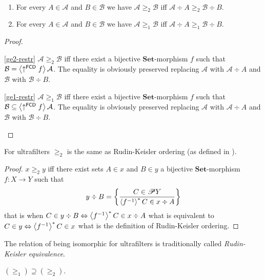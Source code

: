 \begin{prop}
~
\begin{enumerate}
\item \label{ge2-restr}For every $A\in\mathcal{A}$ and $B\in\mathcal{B}$
we have $\mathcal{A}\ge_{2}\mathcal{B}$ iff $\mathcal{A}\div A\ge_{2}\mathcal{B}\div B$.
\item \label{ge1-restr}For every $A\in\mathcal{A}$ and $B\in\mathcal{B}$
we have $\mathcal{A}\ge_{1}\mathcal{B}$ iff $\mathcal{A}\div A\ge_{1}\mathcal{B}\div B$.
\end{enumerate}
\end{prop}
\begin{proof}
~
\begin{widedisorder}
\item [{\ref{ge2-restr}}] $\mathcal{A}\ge_{2}\mathcal{B}$ iff there exist
a bijective $\mathbf{Set}$-morphism $f$ such that $\mathcal{B}=\left\langle \uparrow^{\mathsf{FCD}}f\right\rangle\mathcal{A}$.
The equality is obviously preserved replacing $\mathcal{A}$ with
$\mathcal{A}\div A$ and $\mathcal{B}$ with $\mathcal{B}\div B$.
\item [{\ref{ge1-restr}}] $\mathcal{A}\ge_{1}\mathcal{B}$ iff there exist
a bijective $\mathbf{Set}$-morphism $f$ such that $\mathcal{B}\subseteq\left\langle \uparrow^{\mathsf{FCD}}f\right\rangle\mathcal{A}$.
The equality is obviously preserved replacing $\mathcal{A}$ with
$\mathcal{A}\div A$ and $\mathcal{B}$ with $\mathcal{B}\div B$.
\end{widedisorder}
\end{proof}
\begin{prop}
For ultrafilters $\ge_{2}$ is the same as Rudin-Keisler ordering
(as defined in \cite{comfort-ultra}).\end{prop}
\begin{proof}
$x\ge_{2}y$ iff there exist sets $A\in x$ and $B\in y$ a bijective
$\mathbf{Set}$-morphism $f:X\rightarrow Y$ such that
\[
y\div B=\left\{ \frac{C\in\mathscr{P} Y}{\left\langle f^{-1}\right\rangle ^{\ast}C\in x\div A}\right\}
\]
 that is when $C\in y\div B\Leftrightarrow\left\langle f^{-1}\right\rangle ^{\ast}C\in x\div A$
what is equivalent to~$C\in y\Leftrightarrow\left\langle f^{-1}\right\rangle ^{\ast}C\in x$
what is the definition of Rudin-Keisler ordering.\end{proof}
\begin{rem}
The relation of being isomorphic
for ultrafilters is traditionally called \emph{Rudin-Keisler equivalence}.\end{rem}
\begin{obvious}
$(\ge_{1})\supseteq(\ge_{2})$.\end{obvious}
